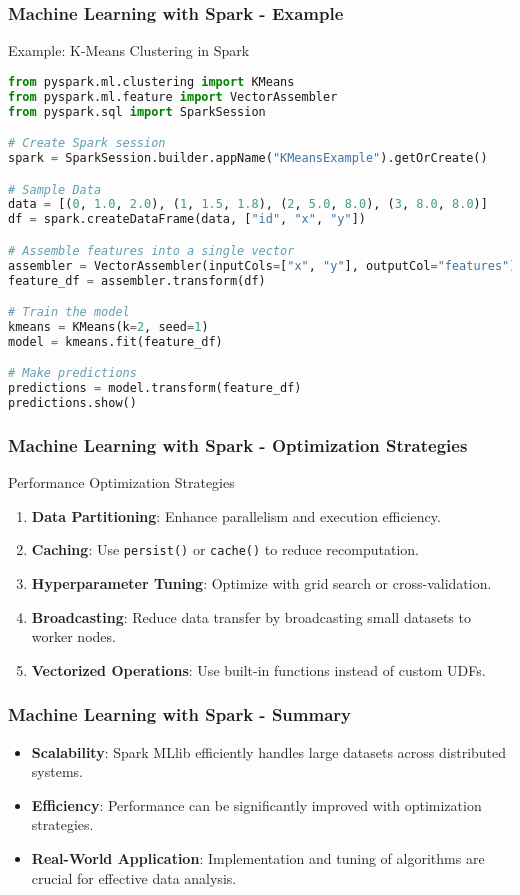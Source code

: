 \documentclass[aspectratio=169]{beamer}
\begin{document}
\begin{frame}[fragile]
    \frametitle{Machine Learning with Spark - Example}
    \begin{block}{Example: K-Means Clustering in Spark}
        \begin{lstlisting}[language=Python]
from pyspark.ml.clustering import KMeans
from pyspark.ml.feature import VectorAssembler
from pyspark.sql import SparkSession

# Create Spark session
spark = SparkSession.builder.appName("KMeansExample").getOrCreate()

# Sample Data
data = [(0, 1.0, 2.0), (1, 1.5, 1.8), (2, 5.0, 8.0), (3, 8.0, 8.0)]
df = spark.createDataFrame(data, ["id", "x", "y"])

# Assemble features into a single vector
assembler = VectorAssembler(inputCols=["x", "y"], outputCol="features")
feature_df = assembler.transform(df)

# Train the model
kmeans = KMeans(k=2, seed=1)
model = kmeans.fit(feature_df)

# Make predictions
predictions = model.transform(feature_df)
predictions.show()
        \end{lstlisting}
    \end{block}
\end{frame}

\begin{frame}[fragile]
    \frametitle{Machine Learning with Spark - Optimization Strategies}
    \begin{block}{Performance Optimization Strategies}
        \begin{enumerate}
            \item \textbf{Data Partitioning}: Enhance parallelism and execution efficiency.
            \item \textbf{Caching}: Use \texttt{persist()} or \texttt{cache()} to reduce recomputation.
            \item \textbf{Hyperparameter Tuning}: Optimize with grid search or cross-validation.
            \item \textbf{Broadcasting}: Reduce data transfer by broadcasting small datasets to worker nodes.
            \item \textbf{Vectorized Operations}: Use built-in functions instead of custom UDFs.
        \end{enumerate}
    \end{block}
\end{frame}

\begin{frame}[fragile]
    \frametitle{Machine Learning with Spark - Summary}
    \begin{itemize}
        \item \textbf{Scalability}: Spark MLlib efficiently handles large datasets across distributed systems.
        \item \textbf{Efficiency}: Performance can be significantly improved with optimization strategies.
        \item \textbf{Real-World Application}: Implementation and tuning of algorithms are crucial for effective data analysis.
    \end{itemize}
\end{frame}
\end{document}
